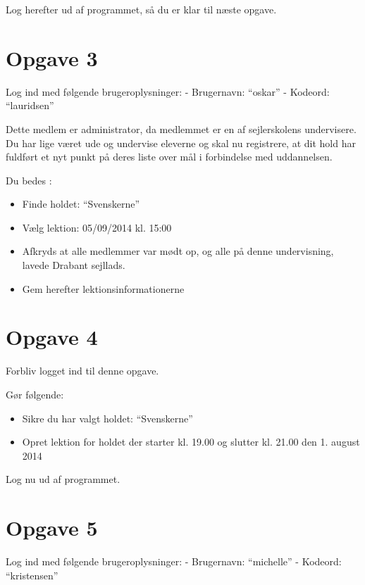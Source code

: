Log herefter ud af programmet, så du er klar til næste opgave.
 
\section{Opgave 3}

Log ind med følgende brugeroplysninger: 
\newline - Brugernavn: ``oskar''
\newline - Kodeord: ``lauridsen''

Dette medlem er administrator, da medlemmet er en af sejlerskolens undervisere.
Du har lige været ude og undervise eleverne og skal nu registrere, at dit hold har fuldført et nyt punkt på deres liste over mål i forbindelse med uddannelsen.

Du bedes :

\begin{itemize}
\item Finde holdet: ``Svenskerne''
\item Vælg lektion: 05/09/2014 kl. 15:00 
\item Afkryds at alle medlemmer var mødt op, og alle på denne undervisning, lavede Drabant sejllads.
\item Gem herefter lektionsinformationerne
\end{itemize}


\section{Opgave 4}

Forbliv logget ind til denne opgave.

Gør følgende:
\begin{itemize}
\item Sikre du har valgt holdet: ``Svenskerne''
\item Opret lektion for holdet der starter kl. 19.00 og slutter kl. 21.00 den 1. august 2014
\end{itemize}

Log nu ud af programmet.

\section{Opgave 5} 

Log ind med følgende brugeroplysninger: 
\newline - Brugernavn: ``michelle''
\newline - Kodeord: ``kristensen''


